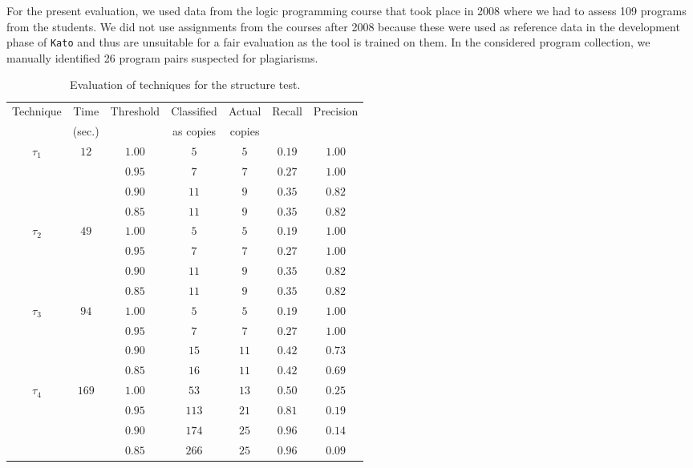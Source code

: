 \documentclass{tlp}
\newcommand{\kato}[0]{\texttt{Kato}\xspace}
\begin{document}
For the present evaluation, we used data from the 
logic programming course that took place in 2008 where we had to assess 109 programs from the students.
We did not use assignments from the courses after 2008 because these were used as reference data in the development phase of \kato and thus are 
unsuitable for a fair evaluation as the tool is trained on them.
In the considered program collection, we manually identified 26 program pairs suspected for plagiarisms.

\begin{table}
	\caption{Evaluation of techniques for the structure test.}
	\label{tab:eval}
{\footnotesize
	\begin{center}
	\begin{tabular}{ccccccc}
	  \hline
	  	     {Technique} & 
	  	     {Time} & 
	  	    {Threshold} & 
	  	    {Classified} & 
	  	    {Actual} & 
	  	    {Recall} & 
	  	    {Precision} \\
	    & (sec.) & & as copies & copies & & \\
	    \toprule
	  \multirow{4}{*}{$\tau_{1}$ } & \multirow{4}{*}{$12$ } & $1.00$ & $5$ & $5$ & $0.19$ & $1.00$  \\ 
	  &  & $0.95$ & $7$ & $7$ & $0.27$ & $1.00$ \\ 
	  &  & $0.90$ & $11$ & $9$ & $0.35$ & $0.82$ \\ 
	  &  & $0.85$ & $11$ & $9$ & $0.35$ & $0.82$ \\ 
	\midrule
	  \multirow{4}{*}{$\tau_{2}$ } & \multirow{4}{*}{$49$ } & $1.00$ & $5$ & $5$ & $0.19$ & $1.00$ \\ 
	  &  & $0.95$ & $7$ & $7$ & $0.27$ & $1.00$ \\ 
	  &  & $0.90$ & $11$ & $9$ & $0.35$ & $0.82$ \\ 
	  &  & $0.85$ & $11$ & $9$ & $0.35$ & $0.82$ \\ 
	\midrule
	  \multirow{4}{*}{$\tau_{3}$ } & \multirow{4}{*}{$94$ } & $1.00$ & $5$ & $5$ & $0.19$ & $1.00$ \\ 
	  &  & $0.95$ & $7$ & $7$ & $0.27$ & $1.00$ \\ 
	  &  & $0.90$ & $15$ & $11$ & $0.42$ & $0.73$ \\ 
	  &  & $0.85$ & $16$ & $11$ & $0.42$ & $0.69$ \\ 
	\midrule
	  \multirow{4}{*}{$\tau_{4}$ } & \multirow{4}{*}{$169$ } & $1.00$ & $53$ & $13$ & $0.50$ & $0.25$ \\ 
	  &  & $0.95$ & $113$ & $21$ & $0.81$ & $0.19$ \\ 
	  &  & $0.90$ & $174$ & $25$ & $0.96$ & $0.14$ \\ 
	  &  & $0.85$ & $266$ & $25$ & $0.96$ & $0.09$  \\ 
	  \bottomrule
	\end{tabular}
	\end{center}
}
\vspace{-1\baselineskip}
\end{table}
\end{document}
